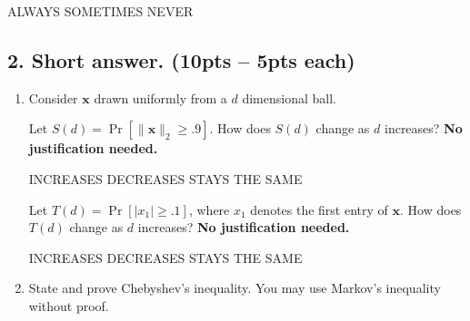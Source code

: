 \documentclass[10pt]{article}
\newcommand{\bv}[1]{\mathbf{#1}}
\begin{document}
\begin{enumerate}[label=(\alph*)]
	ALWAYS\hspace{1em} SOMETIMES\hspace{1em} NEVER\vspace{5em} 
	

	
	
%	
	
\end{enumerate}

\subsection{2. Short answer. (\textbf{\small 10pts -- 5pts each})} 
\begin{enumerate}[label=(\alph*)]
	\item Consider $\bv{x}$ drawn uniformly from a $d$ dimensional ball. \vspace{1em}
	 
	Let $S(d) = \Pr[\|\bv{x}\|_2 \geq .9]$. How does $S(d)$ change as $d$ increases? \textbf{No justification needed.}\vspace{.5em}
	
	INCREASES\hspace{1em} DECREASES\hspace{1em} STAYS THE SAME\vspace{4em}
	\vspace{3em}

	Let $T(d) = \Pr[|x_1| \geq .1]$, where $x_1$ denotes the first entry of $\bv{x}$. How does $T(d)$ change as $d$ increases? \textbf{No justification needed.}\vspace{.5em}
	
	INCREASES\hspace{1em} DECREASES\hspace{1em} STAYS THE SAME\vspace{4em}
	\vspace{3em}



	
	\item State and prove Chebyshev's inequality. You may use Markov's inequality without proof.

\end{enumerate}
\end{document}
